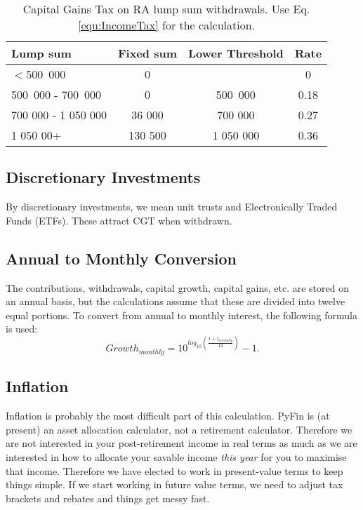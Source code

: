 \documentclass[a4paper, justified]{tufte-handout}
\begin{document}
\begin{table}[]
	\centering
	\caption{Capital Gains Tax on RA lump sum withdrawals. Use Eq.\ref{equ:IncomeTax} for the calculation.}
	\label{tab:CGTRA}
	\begin{tabular}{lccc}
		\toprule
		\textbf{Lump sum}  & \textbf{Fixed sum} & \textbf{Lower Threshold} & \textbf{Rate} \\
		\midrule
		$<$500~000            & 0         &          & 0 \\
		500~000 - 700~000  & 0    & 500~000         & 0.18 \\
		700 000 - 1 050 000  & 36 000   & 700 000          & 0.27  \\
		1 050 00+  & 130 500   & 1 050 000      & 0.36  \\
		\bottomrule
	\end{tabular}
\end{table}

\subsection{Discretionary Investments}
By discretionary investments, we mean unit trusts and Electronically Traded Funds (ETFs). These attract CGT when withdrawn.

\subsection{Annual to Monthly Conversion}
The contributions, withdrawals, capital growth, capital gains, etc. are stored on an annual basis, but the calculations assume that these are divided into twelve equal portions. To convert from annual to monthly interest, the following formula is used:
\begin{equation}
Growth_{monthly} = 10^{log_{10}\left(\frac{1 +i_{annually}}{12}\right)} - 1.
\end{equation}

\subsection{Inflation}
Inflation is probably the most difficult part of this calculation. PyFin is (at present) an asset allocation calculator, not a retirement calculator. Therefore we are not interested in your post-retirement income in real terms as much as we are interested in how to allocate your savable income \textit{this year} for you to maximise that income. Therefore we have elected to work in present-value terms to keep things simple. If we start working in future value terms, we need to adjust tax brackets and rebates and things get messy fast.
\end{document}
